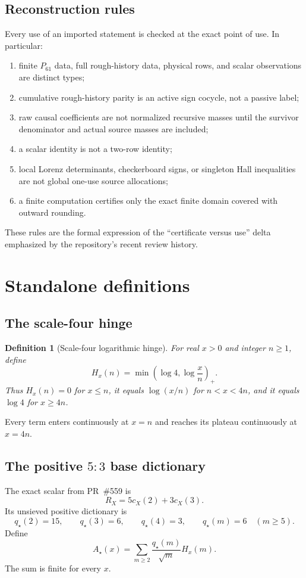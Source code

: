 \documentclass[11pt]{article}
\newtheorem{definition}[theorem]{Definition}
\begin{document}
\subsection{Reconstruction rules}
Every use of an imported statement is checked at the exact point of use.  In particular:
\begin{enumerate}[label=(R\arabic*)]
\item finite $P_{61}$ data, full rough-history data, physical rows, and scalar observations are distinct types;
\item cumulative rough-history parity is an active sign cocycle, not a passive label;
\item raw causal coefficients are not normalized recursive masses until the survivor denominator and actual source masses are included;
\item a scalar identity is not a two-row identity;
\item local Lorenz determinants, checkerboard signs, or singleton Hall inequalities are not global one-use source allocations;
\item a finite computation certifies only the exact finite domain covered with outward rounding.
\end{enumerate}
These rules are the formal expression of the ``certificate versus use'' delta emphasized by the repository's recent review history.

\section{Standalone definitions}

\subsection{The scale-four hinge}
\begin{definition}[Scale-four logarithmic hinge]
For real $x>0$ and integer $n\ge1$, define
\[
 H_x(n)=\min\!\left(\log4,\log\frac xn\right)_+.
\]
Thus $H_x(n)=0$ for $x\le n$, it equals $\log(x/n)$ for $n<x<4n$, and it equals $\log4$ for $x\ge4n$.
\end{definition}
Every term enters continuously at $x=n$ and reaches its plateau continuously at $x=4n$.

\subsection{The positive $5{:}3$ base dictionary}
The exact scalar from PR~\#559 is
\[
 R_X=5c_X(2)+3c_X(3).
\]
Its unsieved positive dictionary is
\[
 q_\star(2)=15,\qquad q_\star(3)=6,\qquad q_\star(4)=3,
 \qquad q_\star(m)=6\quad(m\ge5).
\]
Define
\[
 A_\star(x)=\sum_{m\ge2}\frac{q_\star(m)}{\sqrt m}H_x(m).
\]
The sum is finite for every $x$.
\end{document}
